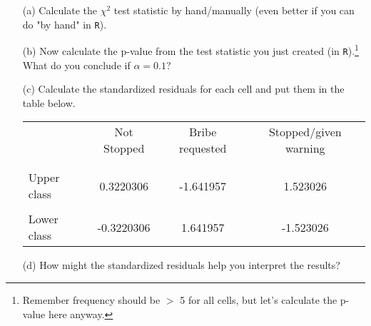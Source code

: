 \documentclass[12pt,letterpaper]{article}
\begin{document}
\begin{enumerate}
	
	\item [(a)]
	Calculate the $\chi^2$ test statistic by hand/manually (even better if you can do "by hand" in \texttt{R}).\\
	\vspace{0.2cm}
	
	
	
	\item [(b)]
	Now calculate the p-value from the test statistic you just created (in \texttt{R}).\footnote{Remember frequency should be $>$ 5 for all cells, but let's calculate the p-value here anyway.}  What do you conclude if $\alpha = 0.1$?\\
	
	
	
	\newpage
	\item [(c)] Calculate the standardized residuals for each cell and put them in the table below.
	\vspace{0.2cm}
	
	
	
	\newpage
	\begin{table}[h]
		\centering
		\begin{tabular}{l | c c c }
			& Not Stopped & Bribe requested & Stopped/given warning \\
			\\[-1.8ex] 
			\hline \\[-1.8ex]
			Upper class  & 0.3220306 & -1.641957  & 1.523026 \\
			\\
			Lower class & -0.3220306 &  1.641957 &  -1.523026  \\
			
		\end{tabular}
	\end{table}
	
	
	\vspace{1cm}
	\item [(d)] How might the standardized residuals help you interpret the results?  
	

\end{enumerate}
\end{document}
